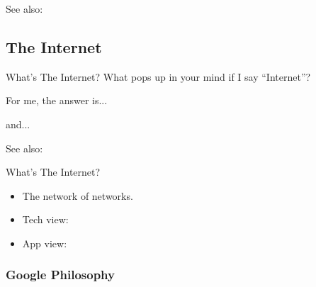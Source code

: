 See also: 

\subsection[Internet]{The Internet}

\begin{frame}{What's The Internet?}
  What pops up in your mind if I say ``Internet''?\pause
  
  \begin{iblock}{For me, the answer is...}
    \begin{center}
    \end{center}
      and...\pause
    \begin{center}
    \end{center}
  \end{iblock}
\end{frame}

See also: 

\begin{frame}{What's The Internet?}
  \begin{itemize}
  \item The network of networks.
  \item Tech view: \href{http://en.wikipedia.org/wiki/Tcp/ip}{{\tcpip}}
  \item App view: \href{http://en.wikipedia.org/wiki/Google}{\googlelogo}
  \end{itemize}
\end{frame}

\subsubsection[Why Google?]{Google Philosophy}

